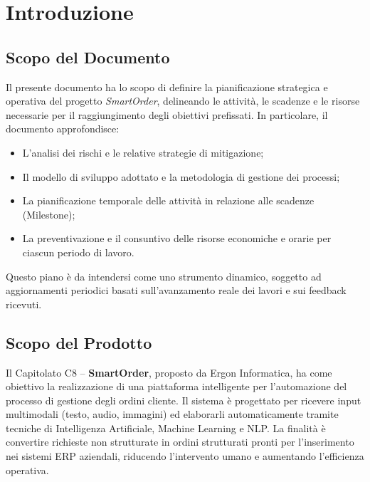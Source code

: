 \documentclass[a4paper, 11pt, oneside]{scrartcl} %
\begin{document}
\newpage
\section{Introduzione}

\subsection{Scopo del Documento}
Il presente documento ha lo scopo di definire la pianificazione strategica e operativa del progetto \textit{SmartOrder}, delineando le attività, le scadenze e le risorse necessarie per il raggiungimento degli obiettivi prefissati. 
In particolare, il documento approfondisce:
\begin{itemize}
    \item L'analisi dei rischi e le relative strategie di mitigazione{\scriptsize{}};
    \item Il modello di sviluppo adottato{\scriptsize{}} e la metodologia di gestione dei processi;
    \item La pianificazione temporale delle attività in relazione alle scadenze (Milestone{\scriptsize{}});
    \item La preventivazione e il consuntivo{\scriptsize{}} delle risorse economiche e orarie per ciascun periodo di lavoro.
\end{itemize}
Questo piano è da intendersi come uno strumento dinamico, soggetto ad aggiornamenti periodici basati sull'avanzamento reale dei lavori e sui feedback ricevuti.

\subsection{Scopo del Prodotto}
Il Capitolato{\scriptsize{}} C8 – \textbf{SmartOrder}, proposto da Ergon Informatica, ha come obiettivo la realizzazione di una piattaforma intelligente per l’automazione del processo di gestione degli ordini cliente.
Il sistema è progettato per ricevere input multimodali (testo, audio, immagini) ed elaborarli automaticamente tramite tecniche di Intelligenza Artificiale{\scriptsize{}}, Machine Learning{\scriptsize{}} e NLP{\scriptsize{}}.
La finalità è convertire richieste non strutturate in ordini strutturati pronti per l'inserimento nei sistemi ERP{\scriptsize{}} aziendali, riducendo l'intervento umano e aumentando l'efficienza operativa.
\end{document}
